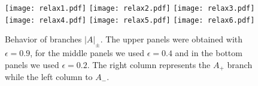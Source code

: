 \documentclass[twocolumn,showpacs,nofootinbib,floats,amsmath,amssymb]{revtex4}
\begin{document}
\begin{figure}[htbp!]
\centering
\texttt{[image: relax1.pdf]}
\texttt{[image: relax2.pdf]}
\texttt{[image: relax3.pdf]}
\texttt{[image: relax4.pdf]}
\texttt{[image: relax5.pdf]}
\texttt{[image: relax6.pdf]}   
\caption{Behavior of branches $\left| A\right|_{\pm}$. The upper panels were obtained with $\epsilon = 0.9$, for the middle panels we used $\epsilon = 0.4$ and in the bottom panels we used $\epsilon = 0.2$. The right column represents the $A_{+}$ branch while the left column to $A_{-}$.} 
\label{fig:absolution}
\end{figure}

\twocolumngrid

\end{document}
